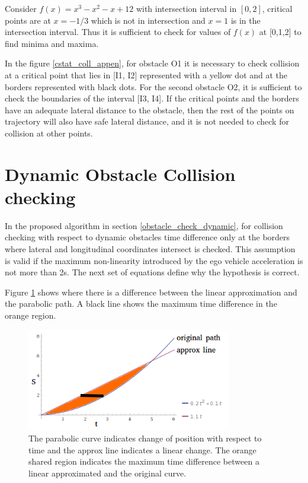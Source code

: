 Consider $f(x) = x^3 - x^2 -x + 12$ with intersection interval in $[0,2]$, critical points are at $x=-1/3$ which is not in intersection and $x=1$ is in the intersection interval. Thus it is sufficient to check for values of $f(x)$ at [0,1,2] to find minima and maxima. 

In the figure \ref{cstat_coll_appen}, for obstacle O1 it is necessary to check collision at a critical point that lies in [I1, I2] represented with a yellow dot and at the borders represented with black dots. For the second obstacle O2, it is sufficient to check the boundaries of the interval [I3, I4]. If the critical points and the borders have an adequate lateral distance to the obstacle, then the rest of the points on trajectory will also have safe lateral distance, and it is not needed to check for collision at other points. 


\section{Dynamic Obstacle Collision checking}
\label{dynamic_obst_appendix}

In the proposed algorithm in section \ref{obstacle_check_dynamic}, for collision checking with respect to dynamic obstacles time difference only at the borders where lateral and longitudinal coordinates intersect is checked. This assumption is valid if the maximum non-linearity introduced by the ego vehicle acceleration is not more than 2s. The next set of equations define why the hypothesis is correct. 

Figure \ref{dynamic_approx_appen} shows where there is a difference between the linear approximation and the parabolic path. A black line shows the maximum time difference in the orange region. 

\begin{figure}
	\centering
	\includegraphics[width=0.8\textwidth]{Images/appendix/dynamic_approx.png}
	\caption{The parabolic curve indicates change of position with respect to time and the approx line indicates a linear change. The orange shared region indicates the maximum time difference between a linear approximated and the original curve. }
	\label{dynamic_approx_appen}
\end{figure}

